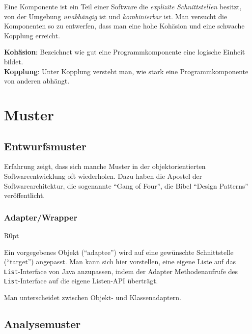 \documentclass[german]{panikzettel}
\begin{document}
Eine Komponente ist ein Teil einer Software die \emph{explizite Schnittstellen} besitzt, von der Umgebung \emph{unabhängig} ist und \emph{kombinierbar} ist.
Man versucht die Komponenten so zu entwerfen, dass man eine hohe Kohäsion und eine schwache Kopplung erreicht.

\textbf{Kohäsion}: Bezeichnet wie gut eine Programmkomponente eine logische Einheit bildet.\\
\textbf{Kopplung}: Unter Kopplung versteht man, wie stark eine Programmkomponente von anderen abhängt.

\section{Muster}
\label{sec:muster}

\subsection{Entwurfsmuster}

Erfahrung zeigt, dass sich manche Muster in der objektorientierten Softwareentwicklung oft wiederholen.
Dazu haben die Apostel der Softwarearchitektur, die sogenannte ``Gang of Four'', die Bibel ``Design Patterns'' veröffentlicht.

\subsubsection{Adapter/Wrapper}

\begin{wrapfigure}[10]{R}{0pt}
\end{wrapfigure}

Ein vorgegebenes Objekt (``adaptee'') wird auf eine gewünschte Schnittstelle (``target'') angepasst.
Man kann sich hier vorstellen, eine eigene Liste auf das \lstinline{List}-Interface von Java anzupassen, indem der Adapter Methodenaufrufe des \lstinline{List}-Interface auf die eigene Listen-API überträgt.

Man unterscheidet zwischen Objekt- und Klassenadaptern. %

\subsection{Analysemuster}
\end{document}
